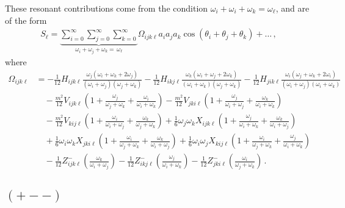 \documentclass[letterpaper,11pt]{article}
\newcommand{\oi}{\omega_i}
\newcommand{\oj}{\omega_j}
\newcommand{\ok}{\omega_k}
\newcommand{\ol}{\omega_\ell}
\newcommand{\thi}{\theta_i}
\newcommand{\thj}{\theta_j}
\newcommand{\thk}{\theta_k}
\begin{document}
These resonant contributions come from the condition $\oi + \oi + \ok = \ol$, and are of the form
\begin{align}
S_\ell = \underbrace{\sum_{i=0}^\infty \sum_{j=0}^\infty \sum_{k=0}^\infty}_{\oi + \oj + \ok = \, \ol} \Omega_{ijk\ell} a_i a_j a_k \cos \left( \thi + \thj + \thk \right) + \ldots \, ,
\end{align}
where
\begin{align}
\label{omega}
\Omega_{ijk\ell} &= -\frac{1}{12}H_{ijk\ell} \frac{\oj (\oi + \ok +2\oj)}{(\oi + \oj)(\oj + \ok)} - \frac{1}{12} H_{ikj\ell} \frac{\ok (\oi + \oj + 2\ok)}{(\oi + \ok)(\oj + \ok)}- \frac{1}{12} H_{jik\ell} \frac{\oi (\oj + \ok +2\oi)}{(\oi + \oj)(\oi + \ok)} \nonumber \\
%
& \quad - \frac{m^2}{12} V_{ijk\ell} \left( 1 + \frac{\oj}{\oj + \ok} + \frac{\oi}{\oi + \ok} \right) - \frac{m^2}{12} V_{jki\ell} \left( 1 + \frac{\oj}{\oi + \oj} + \frac{\ok}{\oi + \ok} \right) \nonumber \\
%
& \quad - \frac{m^2}{12} V_{kij\ell} \left( 1 + \frac{\oi}{\oi + \oj} + \frac{\ok}{\oj + \ok} \right)  + \frac{1}{6} \oj \ok X_{ijk\ell} \left( 1 + \frac{\oj}{\oi + \ok} + \frac{\ok}{\oi + \oj} \right) \nonumber \\
%
& \quad + \frac{1}{6} \oi \ok X_{jki\ell} \left( 1 + \frac{\oi}{\oj + \ok} + \frac{\ok}{\oi + \oj} \right) + \frac{1}{6} \oi \oj X_{kij\ell} \left( 1 + \frac{\oi}{\oj + \ok} + \frac{\oj}{\oi + \ok} \right) \nonumber \\
%
& \quad - \frac{1}{12} Z^-_{ijk\ell} \left( \frac{\ok}{\oi + \oj} \right) - \frac{1}{12} Z^-_{ikj\ell} \left( \frac{\oj}{\oi + \ok} \right) - \frac{1}{12} Z^-_{jki\ell}  \left( \frac{\oi}{\oj + \ok} \right) \, .
\end{align}


\subsection{$(+--)$}
\end{document}
